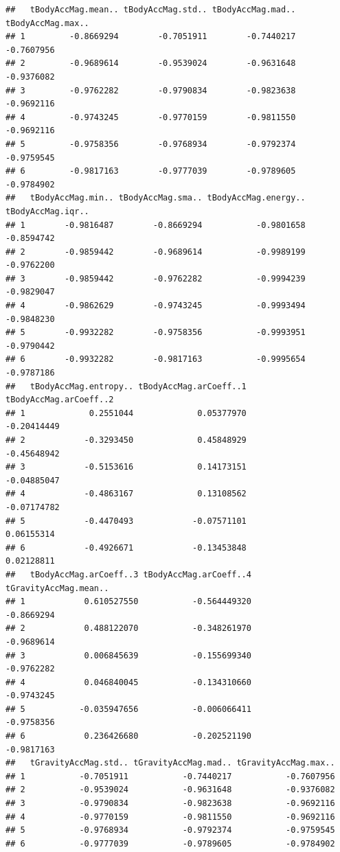 \documentclass[
]{article}
\begin{document}
\begin{verbatim}
##   tBodyAccMag.mean.. tBodyAccMag.std.. tBodyAccMag.mad.. tBodyAccMag.max..
## 1         -0.8669294        -0.7051911        -0.7440217        -0.7607956
## 2         -0.9689614        -0.9539024        -0.9631648        -0.9376082
## 3         -0.9762282        -0.9790834        -0.9823638        -0.9692116
## 4         -0.9743245        -0.9770159        -0.9811550        -0.9692116
## 5         -0.9758356        -0.9768934        -0.9792374        -0.9759545
## 6         -0.9817163        -0.9777039        -0.9789605        -0.9784902
##   tBodyAccMag.min.. tBodyAccMag.sma.. tBodyAccMag.energy.. tBodyAccMag.iqr..
## 1        -0.9816487        -0.8669294           -0.9801658        -0.8594742
## 2        -0.9859442        -0.9689614           -0.9989199        -0.9762200
## 3        -0.9859442        -0.9762282           -0.9994239        -0.9829047
## 4        -0.9862629        -0.9743245           -0.9993494        -0.9848230
## 5        -0.9932282        -0.9758356           -0.9993951        -0.9790442
## 6        -0.9932282        -0.9817163           -0.9995654        -0.9787186
##   tBodyAccMag.entropy.. tBodyAccMag.arCoeff..1 tBodyAccMag.arCoeff..2
## 1             0.2551044             0.05377970            -0.20414449
## 2            -0.3293450             0.45848929            -0.45648942
## 3            -0.5153616             0.14173151            -0.04885047
## 4            -0.4863167             0.13108562            -0.07174782
## 5            -0.4470493            -0.07571101             0.06155314
## 6            -0.4926671            -0.13453848             0.02128811
##   tBodyAccMag.arCoeff..3 tBodyAccMag.arCoeff..4 tGravityAccMag.mean..
## 1            0.610527550           -0.564449320            -0.8669294
## 2            0.488122070           -0.348261970            -0.9689614
## 3            0.006845639           -0.155699340            -0.9762282
## 4            0.046840045           -0.134310660            -0.9743245
## 5           -0.035947656           -0.006066411            -0.9758356
## 6            0.236426680           -0.202521190            -0.9817163
##   tGravityAccMag.std.. tGravityAccMag.mad.. tGravityAccMag.max..
## 1           -0.7051911           -0.7440217           -0.7607956
## 2           -0.9539024           -0.9631648           -0.9376082
## 3           -0.9790834           -0.9823638           -0.9692116
## 4           -0.9770159           -0.9811550           -0.9692116
## 5           -0.9768934           -0.9792374           -0.9759545
## 6           -0.9777039           -0.9789605           -0.9784902

\end{verbatim}
\end{document}
